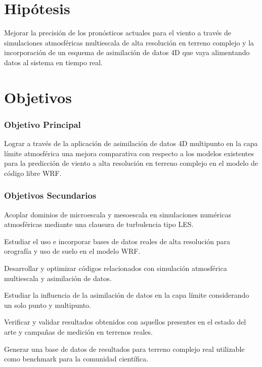 \section{Hipótesis}

Mejorar la precisión de los pronósticos actuales para el viento a través de simulaciones atmosféricas multiescala de alta resolución en terreno complejo y la incorporación de un esquema de asimilación de datos 4D que vaya alimentando datos al sistema en tiempo real.

\section{Objetivos}
\subsubsection{Objetivo Principal}
\begin{itemize*}
	\item Lograr a través de la aplicación de asimilación de datos 4D multipunto en la capa límite atmosférica una mejora comparativa con respecto a los modelos existentes para la predicción de viento a alta resolución en terreno complejo en el modelo de código libre WRF.
\end{itemize*}
\subsubsection{Objetivos Secundarios}
\begin{itemize*}
	\item Acoplar dominios de microescala y mesoescala en simulaciones numéricas atmosféricas mediante una clausura de turbulencia tipo LES.
	\item Estudiar el uso e incorporar bases de datos reales de alta resolución para orografía y uso de suelo en el modelo WRF.
	\item Desarrollar y optimizar códigos relacionados con simulación atmosférica multiescala y asimilación de datos.
	\item Estudiar la influencia de la asimilación de datos en la capa límite considerando un solo punto y multipunto.
	\item Verificar y validar resultados obtenidos con aquellos presentes en el estado del arte y campañas de medición en terrenos reales.
	\item Generar una base de datos de resultados para terreno complejo real utilizable como benchmark para la comunidad científica. 
\end{itemize*}

